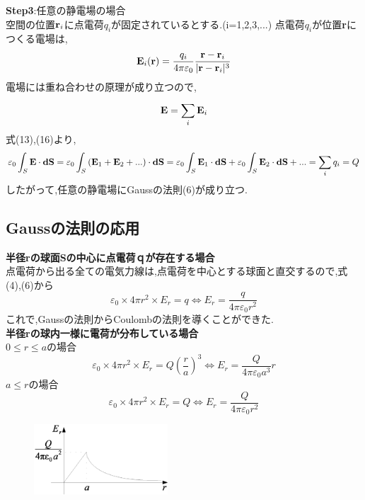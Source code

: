 \documentclass{jsarticle}
\begin{document}
\noindent
{\bf Step3}:任意の静電場の場合 \\
空間の位置${\bf r}_i$に点電荷$q_i$が固定されているとする.(i=1,2,3,...)
点電荷$q_i$が位置{\bf r}につくる電場は,
\begin{eqnarray}
{\bf E}_i({\bf r}) = \frac{q_i}{4 \pi \varepsilon_0} \frac{{\bf r}-{\bf r}_i}{|{\bf r}-{\bf r}_i|^3}
\end{eqnarray}
電場には重ね合わせの原理が成り立つので,
\begin{eqnarray}
{\bf E}=\sum_{i}^{}{\bf E}_i
\end{eqnarray}
式(13),(16)より,
\begin{equation}
\varepsilon_0 \int_{S}{}{\bf E}\cdot{\bf dS}=\varepsilon_0 \int_{S}{}({\bf E}_1 + {\bf E}_2 + ...) \cdot {\bf dS} \\
=\varepsilon_0 \int_{S}{}{\bf E}_1 \cdot {\bf dS} + \varepsilon_0 \int_{S}{}{\bf E}_2 \cdot {\bf dS} + ... \\
= \sum_{i}^{} q_i = Q
\end{equation}
したがって,任意の静電場にGaussの法則(6)が成り立つ.

\subsection{Gaussの法則の応用}
\noindent
{\bf 半径rの球面Sの中心に点電荷ｑが存在する場合} \\
点電荷から出る全ての電気力線は,点電荷を中心とする球面と直交するので,式(4),(6)から
\begin{equation}
\varepsilon_0 \times 4 \pi r^2 \times E_r = q \Leftrightarrow E_r = \frac{q}{4 \pi \varepsilon_0 r^2}
\end{equation}
これで,Gaussの法則からCoulombの法則を導くことができた.\\

\noindent
{\bf 半径rの球内一様に電荷が分布している場合}\\
$ 0 \leq r \leq a $の場合\\
\begin{equation}
\varepsilon_0 \times 4 \pi r^2 \times E_r = Q {\left(\frac{r}{a} \right)}^3 \Leftrightarrow E_r = \frac{Q}{4 \pi \varepsilon_0 a^3}r
\end{equation}
$a \leq r$の場合\\
\begin{equation}
\varepsilon_0 \times 4 \pi r^2 \times E_r = Q \Leftrightarrow E_r = \frac{Q}{4 \pi \varepsilon_0 r^2}
\end{equation}

\begin{figure}[htbp]
 \begin{center}
  \includegraphics[width=50mm]{2.4.eps}
 \end{center}
 \caption{}
 \label{fig:one}
\end{figure}
\end{document}
